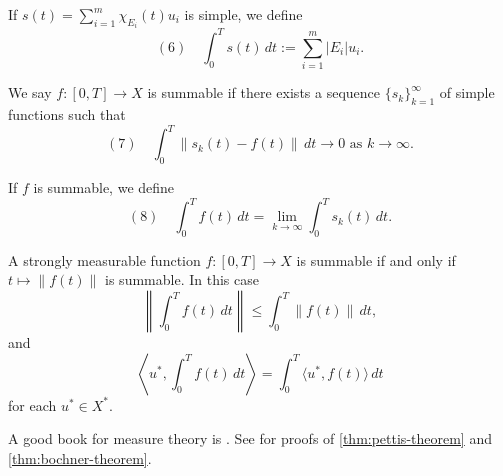 \begin{definition}
\label{def:integral-of-simple-function}
If $s(t) = \sum_{i=1}^m \chi_{E_i}(t)u_i$ is simple, we define
$$(6) \quad \int_0^T s(t) \, dt := \sum_{i=1}^m |E_i|u_i.$$
\end{definition}

\begin{definition}
\label{def:summable-banach-valued-function}
We say $f : [0,T] \to X$ is summable if there exists a sequence $\{s_k\}_{k=1}^\infty$ of simple functions such that
$$(7) \quad \int_0^T \|s_k(t) - f(t)\| \, dt \to 0 \text{ as } k \to \infty.$$
\end{definition}

\begin{definition}
\label{def:bochner-integral}
If $f$ is summable, we define
$$(8) \quad \int_0^T f(t) \, dt = \lim_{k \to \infty} \int_0^T s_k(t) \, dt.$$
\end{definition}

\begin{theorem}[Bochner]
\label{thm:bochner-theorem}
A strongly measurable function $f : [0,T] \to X$ is summable if and only if $t \mapsto \|f(t)\|$ is summable. In this case
$$\left\| \int_0^T f(t) \, dt \right\| \leq \int_0^T \|f(t)\| \, dt,$$
and
$$\left\langle u^*, \int_0^T f(t) \, dt \right\rangle = \int_0^T \langle u^*, f(t) \rangle \, dt$$
for each $u^* \in X^*$.
\end{theorem}

A good book for measure theory is \cite{Folland1984}. See \cite[Chapter V, Sections 4--5]{Yosida1980} for proofs of \cref{thm:pettis-theorem} and \cref{thm:bochner-theorem}.
